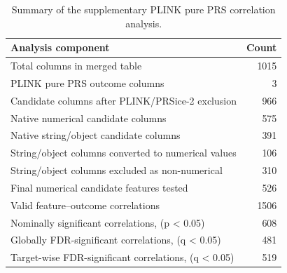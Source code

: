 \documentclass[11pt,a4paper]{article}
\begin{document}
\begin{table}[htbp]
\centering
\caption{Summary of the supplementary PLINK pure PRS correlation analysis.}
\label{tab}
\small
\begin{tabular}{lr}
\toprule
\textbf{Analysis component} & \textbf{Count} \\
\midrule
Total columns in merged table & 1015 \\
PLINK pure PRS outcome columns & 3 \\
Candidate columns after PLINK/PRSice-2 exclusion & 966 \\
Native numerical candidate columns & 575 \\
Native string/object candidate columns & 391 \\
String/object columns converted to numerical values & 106 \\
String/object columns excluded as non-numerical & 310 \\
Final numerical candidate features tested & 526 \\
Valid feature--outcome correlations & 1506 \\
Nominally significant correlations, (p < 0.05) & 608 \\
Globally FDR-significant correlations, (q < 0.05) & 481 \\
Target-wise FDR-significant correlations, (q < 0.05) & 519 \\
\bottomrule
\end{tabular}
\end{table}
\end{document}
